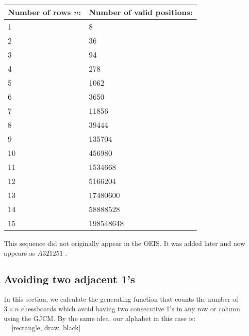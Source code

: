 \documentclass[12pt]{report}
\begin{document}
{{\begin{center}
\begin{tabular}{ |p{3cm}|p{3cm}|  }
 \hline
 Number of rows 	$n$: & Number of valid positions: \\
 \hline
 1 & 8   \\
 2 &   36  \\
 3 & 94 \\
 4 & 278 \\
 5 &   1062  \\
 6 & 3650  \\
 7 & 11856  \\
 8 & 39444  \\
 9 & 135704  \\
 10 & 456980  \\
 11 & 1534668  \\
 12 & 5166204  \\
 13 & 17480600  \\
 14 & 58888528  \\
 15 & 198548648  \\
 \hline
\end{tabular}
\end{center}

\noindent This sequence did not originally appear in the OEIS. It was added later and now appears as $A321251$ \cite{S2015}.



\subsection{Avoiding two adjacent 1's }

In this section, we calculate the generating function that counts the number of $3 \times n$ chessboards which avoid having two consecutive 1's in any row or column using the GJCM. By the same idea, our alphabet in this case is: \\

\tikzset{node distance = 0.55cm and 2cm}
 = [rectangle, draw, black]

\begin{figure}[ht]
        \centering
        \begin{subfigure}[b]{0.1\textwidth}
                \centering

\end{subfigure}\begin{subfigure}[b]{0.1\textwidth}
        	\centering


\end{subfigure}
\end{figure}}}
\end{document}

